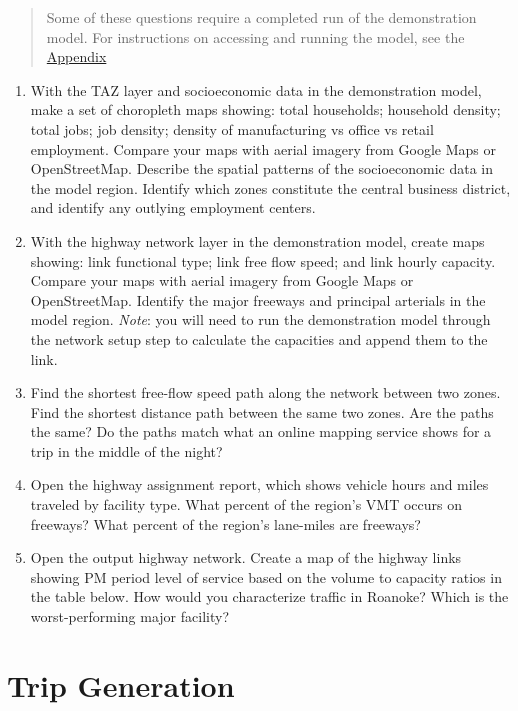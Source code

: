 \documentclass[]{book}
\begin{document}
\begin{quote}
Some of these questions require a completed run of the demonstration model.
For instructions on accessing and running the model, see the \protect\hyperlink{app-demomodel}{Appendix}
\end{quote}

\begin{enumerate}
\def\labelenumi{\arabic{enumi}.}
\item
  With the TAZ layer and socioeconomic data in the demonstration model, make a
  set of choropleth maps showing: total households; household density; total jobs;
  job density; density of manufacturing vs office vs retail employment. Compare
  your maps with aerial imagery from Google Maps or OpenStreetMap. Describe the
  spatial patterns of the socioeconomic data in the model region. Identify which
  zones constitute the central business district, and identify any outlying
  employment centers.
\item
  With the highway network layer in the demonstration model, create maps
  showing: link functional type; link free flow speed; and link hourly capacity.
  Compare your maps with aerial imagery from Google Maps or OpenStreetMap.
  Identify the major freeways and principal arterials in the model region. \emph{Note}:
  you will need to run the demonstration model through the network setup step to
  calculate the capacities and append them to the link.
\item
  Find the shortest free-flow speed path along the network between two zones.
  Find the shortest distance path between the same two zones. Are the paths the
  same? Do the paths match what an online mapping service shows for a trip in the
  middle of the night?
\item
  Open the highway assignment report, which shows vehicle hours and miles
  traveled by facility type. What percent of the region's VMT occurs on freeways?
  What percent of the region's lane-miles are freeways?
\item
  Open the output highway network. Create a map of the
  highway links showing PM period level of service based on the volume to capacity
  ratios in the table below. How would you characterize traffic in Roanoke? Which
  is the worst-performing major facility?
\end{enumerate}

\hypertarget{chap-tripgen}{%
\chapter{Trip Generation}\label{chap-tripgen}}
\end{document}

